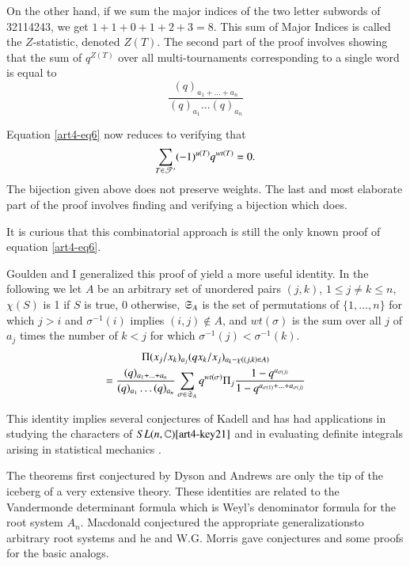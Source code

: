 On the other hand, if we sum the major indices of the two letter subwords of 32114243, we get $1+1+0+1+2+3=8$. This sum of Major Indices is called the $Z$-statistic, denoted $Z(T)$. The second part of the proof involves showing that the sum of $q^{Z(T)}$ over all multi-tournaments corresponding to a single word is equal to 
$$
\frac{(q)_{a_1+\ldots + a_n}}{(q)_{a_1}\ldots (q)_{a_n}}
$$

Equation \eqref{art4-eq6} now reduces to verifying that 
\begin{equation}
\sum\limits_{T \in \mathscr{T}'} (-1)^{u(T)} q^{wt(T)} =0. \label{art4-eq13}
\end{equation}
The bijection given above does not preserve weights. The last and most elaborate part of the proof involves finding and verifying a bijection which does.

It is curious that this combinatorial approach is still the only known proof of equation \eqref{art4-eq6}.

Goulden and I\cite{art4-key3} generalized this proof of yield a more useful identity. In the following we let $A$ be an arbitrary set  of unordered pairs $(j,k)$, $1 \leqslant j \neq k \leqslant n$, $\chi (S)$ is 1 if $S$ is true, 0 otherwise, $\mathfrak{S}_A$ is the set of permutations of $\{1,\ldots, n\}$ for which $j>i$ and $\sigma^{-1} (i)$ implies $(i,j) \not\in A$, and $wt (\sigma)$ is the sum over all $j$ of $a_j$ times the number of $k < j$ for which $\sigma^{-1}(j)< \sigma^{-1}(k)$.
\begin{gather}
[x^0] \Pi (x_j/x_k)_{a_j} (qx_k / x_j)_{a_k - \chi ((j,k) \in A)}\\
= \frac{(q)_{a_1+ \ldots + a_n}}{(q)_{a_1} \ldots (q)_{a_n}} \sum\limits_{\sigma \in \fS_A} q^{wt(\sigma)} \Pi_j \frac{1-q^{a_{\sigma(j)}}}{1-q^{a_{\sigma(1)}+ \ldots + a_{\sigma(j)}}}
\label{art4-eq14}
\end{gather}

This identity implies several conjectures of Kadell \cite{art4-key12} and has had applications in studying the characters of $SL (n,\mathbb{C})\cite{art4-key21}$ and in evaluating definite integrals arising in statistical mechanics \cite{art4-key4}.

The theorems first conjectured by Dyson and Andrews are only the tip of the iceberg of a very extensive theory. These identities are related to the Vandermonde determinant formula which is Weyl's denominator formula for the root system $A_n$. Macdonald \cite{art4-key15} conjectured the appropriate generalizations\pageoriginale to arbitrary root systems and he and W.G. Morris \cite{art4-key16} gave conjectures and some proofs for the basic analogs.

